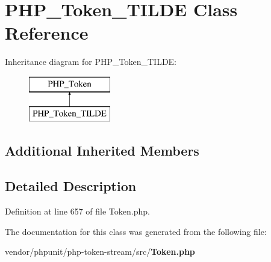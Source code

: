 \section{P\+H\+P\+\_\+\+Token\+\_\+\+T\+I\+L\+D\+E Class Reference}
\label{class_p_h_p___token___t_i_l_d_e}
Inheritance diagram for P\+H\+P\+\_\+\+Token\+\_\+\+T\+I\+L\+D\+E\+:\begin{figure}[H]
\begin{center}
\leavevmode
\includegraphics[height=2.000000cm]{class_p_h_p___token___t_i_l_d_e}
\end{center}
\end{figure}
\subsection*{Additional Inherited Members}


\subsection{Detailed Description}


Definition at line 657 of file Token.\+php.



The documentation for this class was generated from the following file\+:\begin{DoxyCompactItemize}
\item 
vendor/phpunit/php-\/token-\/stream/src/{\bf Token.\+php}\end{DoxyCompactItemize}
